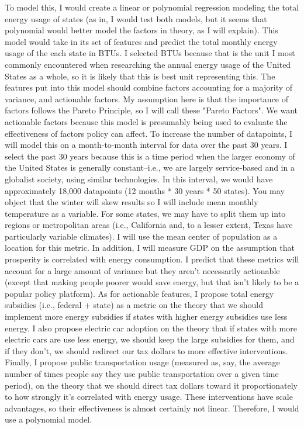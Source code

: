 \documentclass[submit]{harvardml}
\begin{document}
\newpage
To model this, I would create a linear or polynomial regression modeling the total energy usage of states (as in, I would test both models, but it seems that polynomial would better model the factors in theory, as I will explain). This model would take in its set of features and predict the total monthly energy usage of the each state in BTUs. I selected BTUs because that is the unit I most commonly encountered when researching the annual energy usage of the United States as a whole, so it is likely that this is best unit representing this. The features put into this model should combine factors accounting for a majority of variance, and actionable factors. My assumption here is that the importance of factors follows the Pareto Principle, so I will call these "Pareto Factors". We want actionable factors because this model is presumably being used to evaluate the effectiveness of factors policy can affect. 
\newline
To increase the number of datapoints, I will model this on a month-to-month interval for data over the past 30 years. I select the past 30 years because this is a time period when the larger economy of the United States is generally constant--i.e., we are largely service-based and in a globalist society, using similar technologies. In this interval, we would have approximately 18,000 datapoints (12 months * 30 years * 50 states). You may object that the winter will skew results so I will include mean monthly temperature as a variable. For some states, we may have to split them up into regions or metropolitan areas (i.e., California and, to a lesser extent, Texas have particularly variable climates). I will use the mean center of population as a location for this metric. In addition, I will measure GDP on the assumption that prosperity is correlated with energy consumption. I predict that these metrics will account for a large amount of variance but they aren’t necessarily actionable (except that making people poorer would save energy, but that isn’t likely to be a popular policy platform). As for actionable features, I propose total energy subsidies (i.e., federal + state) as a metric on the theory that we should implement more energy subsidies if states with higher energy subsidies use less energy. I also propose electric car adoption on the theory that if states with more electric cars are use less energy, we should keep the large subsidies for them, and if they don’t, we should redirect our tax dollars to more effective interventions. Finally, I propose public transportation usage (measured as, say, the average number of times people say they use public transportation over a given time period), on the theory that we should direct tax dollars toward it proportionately to how strongly it's correlated with energy usage. These interventions have scale advantages, so their effectiveness is almost certainly not linear. Therefore, I would use a polynomial model.
\end{document}
